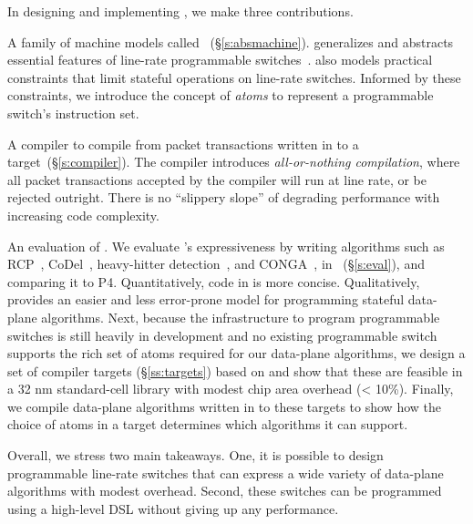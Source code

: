 In designing and implementing \pktlanguage, we make three contributions.
\begin{CompactEnumerate}
\item A family of machine models called \absmachine~(\S\ref{s:absmachine}).
    \absmachine generalizes and abstracts essential features of
line-rate programmable switches~\cite{rmt, xpliant, flexpipe}. \absmachine also
models practical constraints that limit stateful operations on line-rate
switches.  Informed by these constraints, we introduce the concept of {\em
atoms} to represent a programmable switch's instruction set.

\item A compiler to compile from packet transactions written in \pktlanguage
to a \absmachine target~(\S\ref{s:compiler}). The \pktlanguage compiler introduces
\textit{all-or-nothing compilation}, where all packet transactions accepted by
the compiler will run at line rate, or be rejected outright. There is no
``slippery slope'' of degrading performance with increasing code complexity.

\item An evaluation of \pktlanguage. We evaluate \pktlanguage's expressiveness
  by writing algorithms such as RCP~\cite{rcp}, CoDel~\cite{codel},
  heavy-hitter detection~\cite{opensketch}, and CONGA~\cite{conga}, in
  \pktlanguage~(\S\ref{s:eval}), and comparing it to P4.  Quantitatively, code
  in \pktlanguage is more concise. Qualitatively, \pktlanguage provides an
  easier and less error-prone model for programming stateful data-plane
  algorithms.  Next, because the infrastructure to program programmable
  switches is still heavily in development and no existing programmable switch
  supports the rich set of atoms required for our data-plane algorithms, we
  design a set of compiler targets (\S\ref{ss:targets}) based on \absmachine
  and show that these are feasible in a 32 nm standard-cell library with modest
  chip area overhead (< 10\%).  Finally, we compile data-plane algorithms
  written in \pktlanguage to these targets to show how the choice of atoms in a
  target determines which algorithms it can support.
\end{CompactEnumerate}

Overall, we stress two main takeaways. One, it is possible to design
programmable line-rate switches that can express a wide variety of data-plane
algorithms with modest overhead. Second, these switches can be programmed using
a high-level DSL without giving up any performance.
